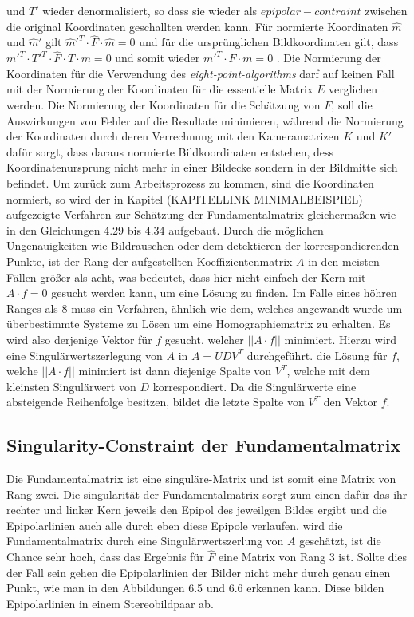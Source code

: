 und $T'$ wieder denormalisiert, so dass sie wieder als $epipolar-contraint$ zwischen die original Koordinaten geschallten werden kann. Für normierte Koordinaten $\hat{m}$ und $\hat{m}'$ gilt $\hat{m}'^T \cdot \hat{F} \cdot \hat{m} = 0$ und für die ursprünglichen Bildkoordinaten gilt, dass $m'^T \cdot T'^T \cdot \hat{F} \cdot T\cdot m = 0$ und somit wieder $m'^T \cdot F\cdot m = 0$ \cite{HZ,HZ8,Ferid}. Die Normierung der Koordinaten für die Verwendung des \textit{eight-point-algorithms} darf auf keinen Fall mit der Normierung der Koordinaten für die essentielle Matrix $E$ verglichen werden. Die Normierung der Koordinaten für die Schätzung von $F$, soll die Auswirkungen von Fehler auf die Resultate minimieren, während die Normierung der Koordinaten durch deren Verrechnung mit den Kameramatrizen $K$ und $K'$ dafür sorgt, dass daraus normierte Bildkoordinaten entstehen, dess Koordinatenursprung nicht mehr in einer Bildecke sondern in der Bildmitte sich befindet\cite{HZ}. Um zurück zum Arbeitsprozess zu kommen, sind die Koordinaten normiert, so wird der in Kapitel (KAPITELLINK MINIMALBEISPIEL) aufgezeigte Verfahren zur Schätzung der Fundamentalmatrix gleichermaßen wie in den Gleichungen 4.29 bis 4.34 aufgebaut. Durch die möglichen Ungenauigkeiten wie Bildrauschen oder dem detektieren der korrespondierenden Punkte, ist der Rang der aufgestellten Koeffizientenmatrix $A$ in den meisten Fällen größer als acht, was bedeutet, dass hier nicht einfach der Kern mit $A\cdot f = 0$ gesucht werden kann, um eine Lösung zu finden. Im Falle eines höhren Ranges als 8 muss ein Verfahren, ähnlich wie dem, welches angewandt wurde um überbestimmte Systeme zu Lösen um eine Homographiematrix zu erhalten. Es wird also derjenige Vektor für $f$ gesucht, welcher $||A\cdot f||$ minimiert. Hierzu wird eine Singulärwertszerlegung von $A$ in $A  = UDV^T$ durchgeführt. die Lösung für $f$, welche $||A\cdot f||$ minimiert ist dann diejenige Spalte von $V^T$, welche mit dem kleinsten Singulärwert von $D$ korrespondiert. Da die Singulärwerte eine absteigende Reihenfolge besitzen, bildet die letzte Spalte von $V^T$ den Vektor $f$\cite{HZ}.\\


\subsection{Singularity-Constraint der Fundamentalmatrix}

Die Fundamentalmatrix ist eine singuläre-Matrix und ist somit eine Matrix von Rang zwei. Die singularität der Fundamentalmatrix sorgt zum einen dafür das ihr rechter und linker Kern jeweils den Epipol des jeweilgen Bildes ergibt und die Epipolarlinien auch alle durch eben diese Epipole verlaufen. wird die Fundamentalmatrix durch eine Singulärwertszerlung von $A$ geschätzt, ist die Chance sehr hoch, dass das Ergebnis für $\hat{F}$ eine Matrix von Rang 3 ist. Sollte dies der Fall sein gehen die Epipolarlinien der Bilder nicht mehr durch genau einen Punkt, wie man in den Abbildungen 6.5 und 6.6 erkennen kann. Diese bilden Epipolarlinien in einem Stereobildpaar ab.\\

